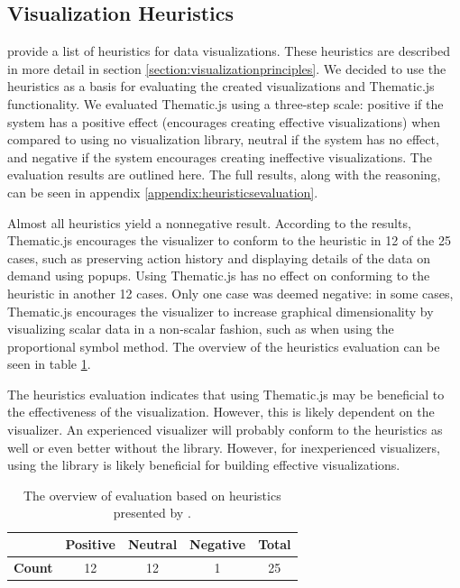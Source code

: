\subsection{Visualization Heuristics}

\citet{zuk_heuristics_2006} provide a list of heuristics for data visualizations. These heuristics are described in more detail in section \ref{section:visualizationprinciples}. We decided to use the heuristics as a basis for evaluating the created visualizations and Thematic.js functionality. We evaluated Thematic.js using a three-step scale: positive if the system has a positive effect (encourages creating effective visualizations) when compared to using no visualization library, neutral if the system has no effect, and negative if the system encourages creating ineffective visualizations. The evaluation results are outlined here. The full results, along with the reasoning, can be seen in appendix \ref{appendix:heuristicsevaluation}.

Almost all heuristics yield a nonnegative result. According to the results, Thematic.js encourages the visualizer to conform to the heuristic in 12 of the 25 cases, such as preserving action history and displaying details of the data on demand using popups. Using Thematic.js has no effect on conforming to the heuristic in another 12 cases. Only one case was deemed negative: in some cases, Thematic.js encourages the visualizer to increase graphical dimensionality by visualizing scalar data in a non-scalar fashion, such as when using the proportional symbol method. The overview of the heuristics evaluation can be seen in table \ref{table:heuristicsevaluationoverview}. 

The heuristics evaluation indicates that using Thematic.js may be beneficial to the effectiveness of the visualization. However, this is likely dependent on the visualizer. An experienced visualizer will probably conform to the heuristics as well or even better without the library. However, for inexperienced visualizers, using the library is likely beneficial for building effective visualizations. 

\begin{table}[h]
\centering
\begin{tabular}{|l|c|c|c|c|}
\hline
 & \textbf{Positive} & \textbf{Neutral} & \textbf{Negative} & \textbf{Total} \\ 
\hline
\textbf{Count} & 12 & 12 & 1 & 25 \\
\hline
\end{tabular}
\caption{The overview of evaluation based on heuristics presented by \citet{zuk_heuristics_2006}.}
\label{table:heuristicsevaluationoverview}
\end{table}

